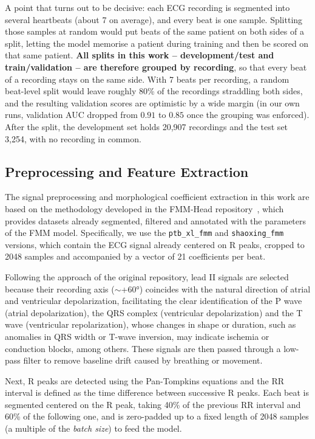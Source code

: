 \documentclass[11pt]{article}
\begin{document}
A point that turns out to be decisive: each ECG recording is segmented into several heartbeats (about 7 on average), and every beat is one sample. Splitting those samples at random would put beats of the same patient on both sides of a split, letting the model memorise a patient during training and then be scored on that same patient. \textbf{All splits in this work -- development/test and train/validation -- are therefore grouped by recording}, so that every beat of a recording stays on the same side. With 7 beats per recording, a random beat-level split would leave roughly 80\% of the recordings straddling both sides, and the resulting validation scores are optimistic by a wide margin (in our own runs, validation AUC dropped from $0.91$ to $0.85$ once the grouping was enforced). After the split, the development set holds 20,907 recordings and the test set 3,254, with no recording in common.

\subsection{Preprocessing and Feature Extraction} \label{sec: Preprocesamiento}

The signal preprocessing and morphological coefficient extraction in this work are based on the methodology developed in the FMM-Head repository~\cite{verardo2023fmmhead}, which provides datasets already segmented, filtered and annotated with the parameters of the FMM model. Specifically, we use the \texttt{ptb\_xl\_fmm} and \texttt{shaoxing\_fmm} versions, which contain the ECG signal already centered on R peaks, cropped to 2048 samples and accompanied by a vector of 21 coefficients per beat.

Following the approach of the original repository, lead II signals are selected because their recording axis ($\sim$+60°) coincides with the natural direction of atrial and ventricular depolarization, facilitating the clear identification of the P wave (atrial depolarization), the QRS complex (ventricular depolarization) and the T wave (ventricular repolarization), whose changes in shape or duration, such as anomalies in QRS width or T-wave inversion, may indicate ischemia or conduction blocks, among others. These signals are then passed through a low-pass filter to remove baseline drift caused by breathing or movement.

Next, R peaks are detected using the Pan-Tompkins equations and the RR interval is defined as the time difference between successive R peaks. Each beat is segmented centered on the R peak, taking 40\% of the previous RR interval and 60\% of the following one, and is zero-padded up to a fixed length of 2048 samples (a multiple of the \textit{batch size}) to feed the model.
\end{document}
